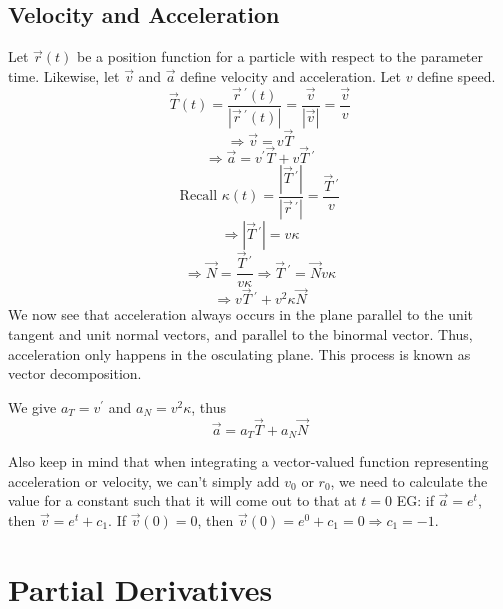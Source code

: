 \section{Velocity and Acceleration}
Let \(\vec{r}(t)\) be a position function for a particle with respect to the parameter time. Likewise, let \(\vec{v}\) and \(\vec{a}\) define velocity and acceleration. Let \(v\) define speed.
\[
    \vec{T}(t)=\frac{\vec{r}\,^{\prime} (t)}{\left\vert \vec{r}\,^{\prime} (t) \right\vert }=\frac{\vec{v}}{\left\vert \vec{v} \right\vert }=\frac{\vec{v}}{v}
\]
\[
    \Longrightarrow \vec{v}=v\vec{T}
\]
\[
    \Longrightarrow \vec{a}=v^{\prime} \vec{T}+v\vec{T}\,^{\prime} 
\]
\[
    \text{Recall } \kappa (t)=\frac{\left\vert \vec{T}\,^{\prime}  \right\vert }{\left\vert \vec{r}\,^{\prime}  \right\vert }=\frac{\vec{T}\,^{\prime} }{v}
\]
\[
    \Longrightarrow \left\vert \vec{T}\,^{\prime} \right\vert =v \kappa 
\]
\[
\Longrightarrow \vec{N}=\frac{\vec{T}\,^{\prime} }{v \kappa }\Longrightarrow \vec{T}\,^{\prime} =\vec{N}v \kappa 
\]
\[
    \Longrightarrow v\vec{T}\,^{\prime} +v^2 \kappa \vec{N}
\]
We now see that acceleration always occurs in the plane parallel to the unit tangent and unit normal vectors, and parallel to the binormal vector. Thus, acceleration only happens in the osculating plane. This process is known as vector decomposition.
\begin{definition}
    We give \(a_T =v^{\prime} \) and \(a_N =v^2 \kappa \), thus
    \[
        \vec{a}=a_T \vec{T}+a_N \vec{N}
    \]
\end{definition}
Also keep in mind that when integrating a vector-valued function representing acceleration or velocity, we can't simply add \(v_0\) or \(r_0\), we need to calculate the value for a constant such that it will come out to that at \(t=0\) EG: if \(\vec{a}=e^t\), then \(\vec{v}=e^t + c_1\). If \(\vec{v}(0)=0\), then \(\vec{v}(0)=e^0 + c_1 = 0 \Longrightarrow c_1 = -1\). 
\newpage
\chapter{Partial Derivatives}

